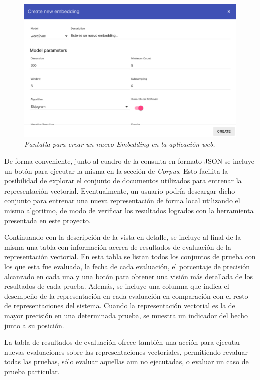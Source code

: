 \begin{figure}[h]
    \centering
    \includegraphics[width=\textwidth]{images/ui-nabu-embeddings-new}
    \caption{\textit{Pantalla para crear un nuevo Embedding en la aplicación web.}}
    \label{fig:ui-nabu-embeddings-new}
\end{figure}

De forma conveniente, junto al cuadro de la consulta en formato JSON se incluye un botón para ejecutar la
misma en la sección de \textit{Corpus}. Esto facilita la posibilidad de explorar el conjunto de documentos
utilizados para entrenar la representación vectorial. Eventualmente, un usuario podría descargar dicho conjunto
para entrenar una nueva representación de forma local utilizando el mismo algoritmo, de modo de verificar los
resultados logrados con la herramienta presentada en este proyecto.

Continuando con la descripción de la vista en detalle, se incluye al final de la misma una tabla con
información acerca de resultados de evaluación de la representación vectorial. En esta tabla se listan todos
los conjuntos de prueba con los que esta fue evaluada, la fecha de cada evaluación, el porcentaje de precisión
alcanzado en cada una y una botón para obtener una visión más detallada de los resultados de cada prueba.
Además, se incluye una columna que indica el desempeño de la representación en cada evaluación en comparación
con el resto de representaciones del sistema. Cuando la representación vectorial es la de mayor precisión en
una determinada prueba, se muestra un indicador del hecho junto a su posición.

La tabla de resultados de evaluación ofrece también una acción para ejecutar nuevas evaluaciones sobre las
representaciones vectoriales, permitiendo revaluar todas las pruebas, sólo evaluar aquellas aun no ejecutadas,
o evaluar un caso de prueba particular.

